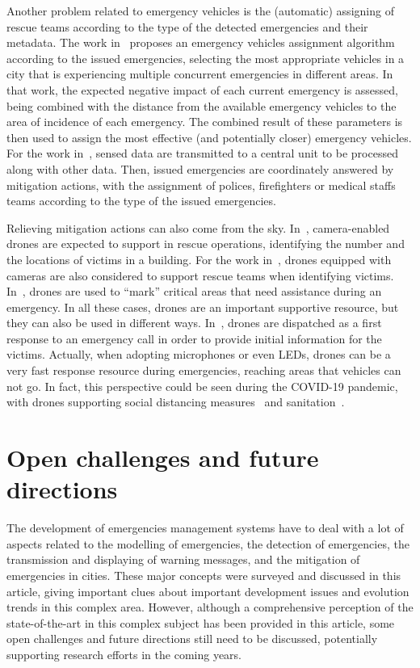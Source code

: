 \begin{refsection}
Another problem related to emergency vehicles is the (automatic) assigning of rescue teams according to the type of the detected emergencies and their metadata. The work in~\cite{costa2020automatic} proposes an emergency vehicles assignment algorithm according to the issued emergencies, selecting the most appropriate vehicles in a city that is experiencing multiple concurrent emergencies in different areas. In that work, the expected negative impact of each current emergency is assessed, being combined with the distance from the available emergency vehicles to the area of incidence of each emergency. The combined result of these parameters is then used to assign the most effective (and potentially closer) emergency vehicles. For the work in~\cite{mitigationurban2}, sensed data are transmitted to a central unit to be processed along with other data. Then, issued emergencies are coordinately answered by mitigation actions, with the assignment of polices, firefighters or medical staffs teams according to the type of the issued emergencies. 

Relieving mitigation actions can also come from the sky. In~\cite{emergencyRescue3}, camera-enabled drones are expected to support in rescue operations, identifying the number and the locations of victims in a building. For the work in~\cite{mitigationurban6}, drones equipped with cameras are also considered to support rescue teams when identifying victims. In~\cite{mitigationAct5}, drones are used to ``mark'' critical areas that need assistance during an emergency. In all these cases, drones are an important supportive resource, but they can also be used in different ways. In~\cite{mitigationurban8}, drones are dispatched as a first response to an emergency call in order to provide initial information for the victims. Actually, when adopting microphones or even LEDs, drones can be a very fast response resource during emergencies, reaching areas that vehicles can not go. In fact, this perspective could be seen during the COVID-19 pandemic, with drones supporting social distancing measures~\cite{dronecovid1} and sanitation~\cite{dronecovid2}.  


\section{Open challenges and future directions}\label{sec7}

The development of emergencies management systems have to deal with a lot of aspects related to the modelling of emergencies, the detection of emergencies, the transmission and displaying of warning messages, and the mitigation of emergencies in cities. These major concepts were surveyed and discussed in this article, giving important clues about important development issues and evolution trends in this complex area. However, although a comprehensive perception of the state-of-the-art in this complex subject has been provided in this article, some open challenges and future directions still need to be discussed, potentially supporting research efforts in the coming years.


\end{refsection}
